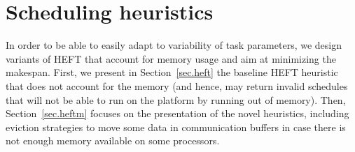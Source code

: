 \documentclass[conference]{IEEEtran}
\newcommand{\skug}[1]{{\color{blue}[SK: #1]}}
\begin{document}
%
%
%


    \section{Scheduling heuristics} %
\label{sec.heuristics}


In order to be able to easily adapt to variability of task parameters, we design
variants of HEFT that account for memory usage and aim at minimizing the makespan.
First, we present in Section~\ref{sec.heft} the baseline HEFT heuristic that does not account for the memory
(and hence, may return invalid schedules that will not be able to run on the platform
by running out of memory).  Then, Section~\ref{sec.heftm} focuses on the presentation of the novel
heuristics, including eviction strategies to move some data in communication buffers
in case there is not enough memory available on some processors.
\end{document}
